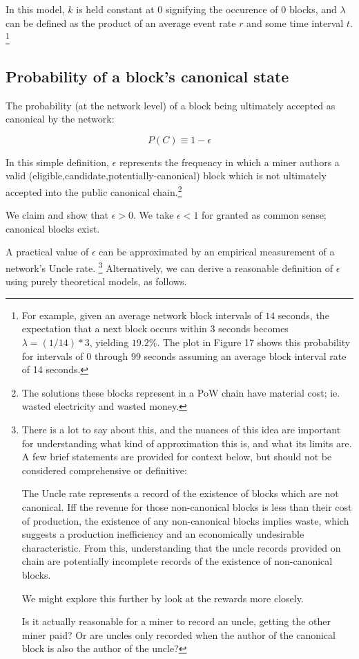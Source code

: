\documentclass[11pt]{article}
\theoremstyle{plain}
\begin{document}
In this model, $k$ is held constant at $0$ signifying the occurence of 0
blocks, and $\lambda$ can be defined as the product of an average event rate
$r$ and some time interval $t$.\nolinebreak
\footnote{
For example, given an average network block intervals of $14$ seconds, the
expectation that a next block occurs within $3$ seconds becomes $\lambda =
(1/14) * 3$, yielding $19.2\%$.
The plot in Figure 17 shows this probability for intervals of 0 through 99
seconds assuming an average block interval rate of 14 seconds.
}

\subsection{\normalsize{Probability of a block's canonical state}}

The probability (at the network level) of a block being ultimately accepted as
canonical by the network:

\begin{equation}
P(C) \equiv 1 - \epsilon
\end{equation}

In this simple definition, $\epsilon$ represents the frequency in which a miner
authors a valid (eligible,candidate,potentially-canonical) block which is not
ultimately accepted into the public canonical chain.\footnote{The solutions
these blocks represent in a PoW chain have material cost; ie. wasted
electricity and wasted money.}

We claim and show that $\epsilon > 0$. We take $\epsilon < 1$ for granted as
common sense; canonical blocks exist.

A practical value of $\epsilon$ can be approximated by an empirical measurement
of a network's Uncle rate.\nolinebreak
\footnote{
  There is a lot to say about this, and the nuances of this idea are important
for understanding what kind of approximation this is, and what its limits are.
  A few brief statements are provided for context below, but should not be
considered comprehensive or definitive:

  The Uncle rate represents a record of the existence of blocks which are not
canonical.
  Iff the revenue for those non-canonical blocks is less than their cost of
production, the existence of any non-canonical blocks implies waste, which
suggests a production inefficiency and an economically undesirable
characteristic.
  From this, understanding that the uncle records provided on chain are
potentially incomplete records of the existence of non-canonical blocks.

  We might explore this further by look at the rewards more closely.

  Is it actually reasonable for a miner to record an uncle, getting the
  other miner paid? Or are uncles only recorded when the author of the
  canonical block is also the author of the uncle?
}
Alternatively, we can derive a reasonable definition of $\epsilon$ using purely
theoretical models, as follows.
\end{document}
